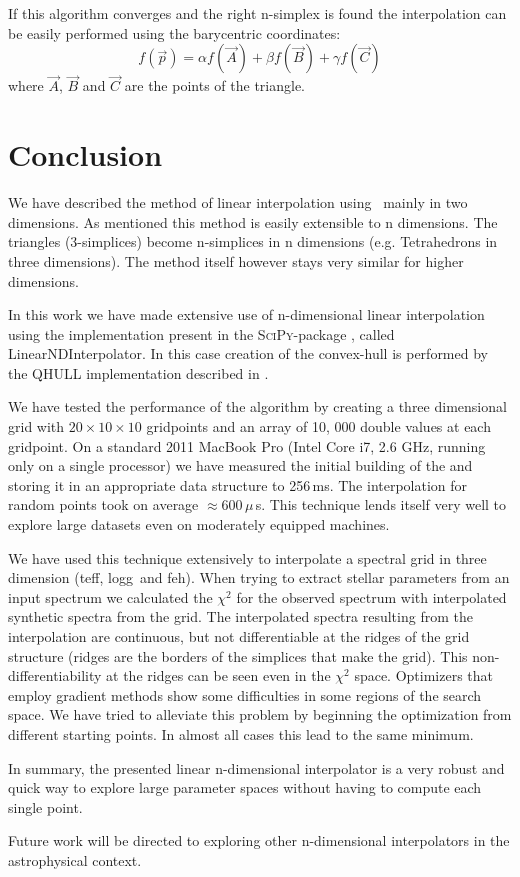 If this algorithm converges and the right n-simplex is found the interpolation can be easily performed using the barycentric coordinates:
\[
f(\vec{p})=\alpha f(\vec{A}) + \beta f(\vec{B}) + \gamma f(\vec{C})
\]
where  $\vec{A}$, $\vec{B}$ and $\vec{C}$ are the points of the triangle. 


\section{Conclusion}

We have described the method of linear interpolation using \deltri\ mainly in two dimensions. As mentioned this method is easily extensible to n dimensions. The triangles (3-simplices) become n-simplices in n dimensions (e.g. Tetrahedrons in three dimensions). The method itself however stays very similar for higher dimensions. 

In this work we have made extensive use of n-dimensional linear interpolation using the implementation present in the \textsc{SciPy}-package \citescipy, called LinearNDInterpolator. In this case creation of the convex-hull is performed by the QHULL implementation described in \citet{Barber96thequickhull}.

We have tested the performance of the algorithm by creating a three dimensional grid with $20\times10\times10$ gridpoints and an array of 10, 000  double values at each gridpoint. 
On a standard 2011 MacBook Pro (Intel Core i7, 2.6 GHz, running only on a single processor) we have measured the initial building of the \deltri and storing it in an appropriate data structure to 256\,ms. The interpolation for random points took on average $\approx600\,\mu$\,s. This technique lends itself very well to explore large datasets even on moderately equipped machines. 

We have used this technique extensively to interpolate a spectral grid in three dimension (\gls{teff}, \gls{logg}\ and \gls{feh}). When trying to extract stellar parameters from an input spectrum we calculated the $\chi^2$ for the observed spectrum with interpolated synthetic spectra from the grid. The interpolated spectra resulting from the interpolation are continuous, but not differentiable at the ridges of the grid structure (ridges are the borders of the simplices that make the grid). This non-differentiability at the ridges can be seen even in the $\chi^2$ space. Optimizers that employ gradient methods \citep[such as MIGRAD][]{James:1975dr} show some difficulties in some regions of the search space. We have tried to alleviate this problem by beginning the optimization from different starting points. In almost all cases this lead to the same minimum.

In summary, the presented linear n-dimensional interpolator is a very robust and quick way to explore large parameter spaces without having to compute each single point. 

Future work will be directed to exploring other n-dimensional interpolators in the astrophysical context. 

